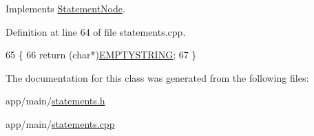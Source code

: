 Implements \hyperlink{classStatementNode_a721589622c930c010927b9a9c55b173e}{Statement\+Node}.



Definition at line 64 of file statements.\+cpp.


\begin{DoxyCode}
65 \{
66     \textcolor{keywordflow}{return} (\textcolor{keywordtype}{char}*)\hyperlink{platform_8h_a79ff1b9ff232b38c8b5600659e6bc7c2}{EMPTYSTRING};
67 \}
\end{DoxyCode}


The documentation for this class was generated from the following files\+:\begin{DoxyCompactItemize}
\item 
app/main/\hyperlink{statements_8h}{statements.\+h}\item 
app/main/\hyperlink{statements_8cpp}{statements.\+cpp}\end{DoxyCompactItemize}
